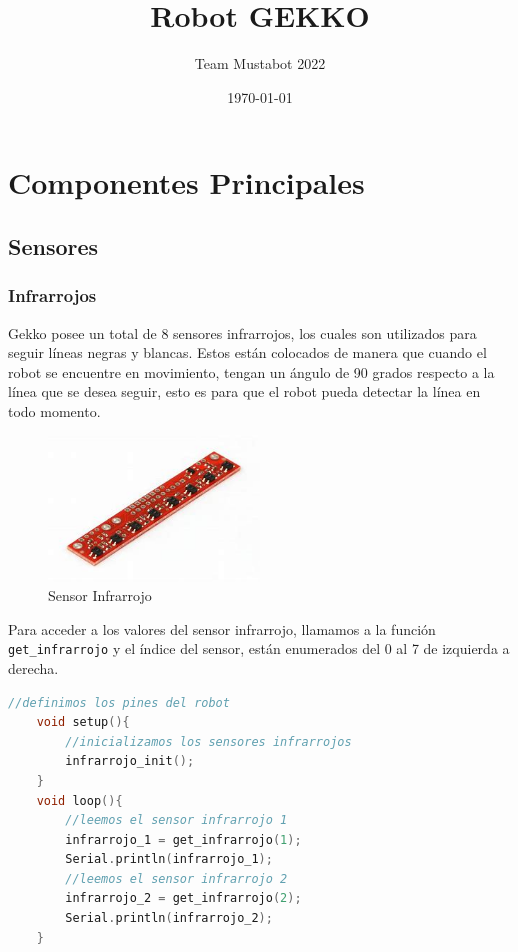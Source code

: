 \documentclass[12pt]{article}
\begin{document}
\title{\textcolor{titlecolor}{Robot GEKKO}}
\author{Team Mustabot 2022}
\date{\today}
\maketitle

\section*{\textcolor{sectioncolor}{Componentes Principales}}
\subsection*{\textcolor{subtitlecolor}{Sensores}}
\subsubsection*{\textcolor{subsubsectioncolor}{Infrarrojos}}
Gekko posee un total de 8 sensores infrarrojos, los cuales son utilizados para seguir líneas negras y blancas.
Estos están colocados de manera que cuando el robot se encuentre en movimiento, tengan un ángulo de 90 grados respecto
a la línea que se desea seguir, esto es para que el robot pueda detectar la línea en todo momento.

\begin{figure}[H]
    \centering
    \includegraphics[width=0.5\textwidth]{sensor_images/infrarrojo.jpeg}
    \caption{Sensor Infrarrojo}
    \label{fig:sensor_infrarrojo}
\end{figure}

Para acceder a los valores del sensor infrarrojo, llamamos a la función \texttt{get\_infrarrojo} y el índice del sensor, están enumerados del 0 al 7 de izquierda
a derecha.

\begin{lstlisting}[language=C++, basicstyle=\color{codecolor}]
    //definimos los pines del robot
    void setup(){
        //inicializamos los sensores infrarrojos
        infrarrojo_init();
    }
    void loop(){
        //leemos el sensor infrarrojo 1
        infrarrojo_1 = get_infrarrojo(1);
        Serial.println(infrarrojo_1);
        //leemos el sensor infrarrojo 2
        infrarrojo_2 = get_infrarrojo(2);
        Serial.println(infrarrojo_2);
    }
\end{lstlisting}
\end{document}
